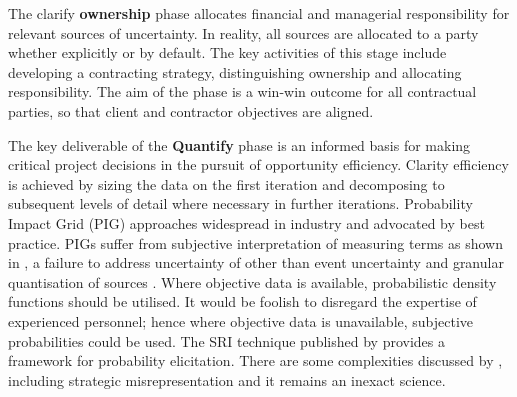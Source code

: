 
The clarify \textbf{ownership} phase allocates financial and managerial responsibility for relevant sources of uncertainty.
In reality, all sources are allocated to a party whether explicitly or by default.
The key activities of this stage include developing a contracting strategy, distinguishing ownership and allocating responsibility.
The aim of the phase is a win-win outcome for all contractual parties, so that client and contractor objectives are aligned.

The key deliverable of the \textbf{Quantify} phase is an informed basis for making critical project decisions in the pursuit of opportunity efficiency.
Clarity efficiency is achieved by sizing the data on the first iteration and decomposing to subsequent levels of detail where necessary in further iterations.
Probability Impact Grid (PIG) approaches widespread in industry and advocated by best practice.
PIGs suffer from subjective interpretation of measuring terms as shown in \citet{Merkhofer}, a failure to address uncertainty of other than event uncertainty and granular quantisation of sources \citep{Cox2008}.
Where objective data is available, probabilistic density functions should be utilised.
It would be foolish to disregard the expertise of experienced personnel; hence where objective data is unavailable, subjective probabilities could be used.
The SRI technique published by \citet{spetzer} provides a framework for probability elicitation.
There are some complexities discussed by \citet{Merkhofer}, including strategic misrepresentation \citep{flyvbjerg} and it remains an inexact science.

